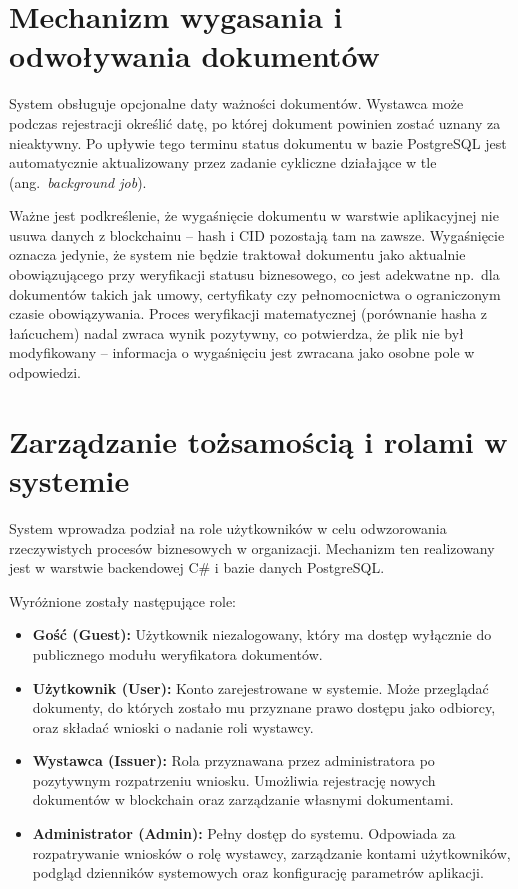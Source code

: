 \documentclass[12pt,a4paper,twoside]{report}
\begin{document}
\section{Mechanizm wygasania i odwoływania dokumentów}

System obsługuje opcjonalne daty ważności dokumentów. Wystawca może podczas rejestracji
określić datę, po której dokument powinien zostać uznany za nieaktywny. Po upływie tego
terminu status dokumentu w bazie PostgreSQL jest automatycznie aktualizowany przez
zadanie cykliczne działające w tle (ang.~\textit{background job}).

Ważne jest podkreślenie, że wygaśnięcie dokumentu w warstwie aplikacyjnej nie usuwa
danych z blockchainu -- hash i CID pozostają tam na zawsze. Wygaśnięcie oznacza jedynie,
że system nie będzie traktował dokumentu jako aktualnie obowiązującego przy weryfikacji
statusu biznesowego, co jest adekwatne np.~dla dokumentów takich jak umowy, certyfikaty
czy pełnomocnictwa o ograniczonym czasie obowiązywania. Proces weryfikacji matematycznej
(porównanie hasha z łańcuchem) nadal zwraca wynik pozytywny, co potwierdza, że plik nie
był modyfikowany -- informacja o wygaśnięciu jest zwracana jako osobne pole w odpowiedzi.

\section{Zarządzanie tożsamością i rolami w systemie}

System wprowadza podział na role użytkowników w celu odwzorowania rzeczywistych procesów
biznesowych w organizacji. Mechanizm ten realizowany jest w warstwie backendowej C\#
i bazie danych PostgreSQL.

Wyróżnione zostały następujące role:
\begin{itemize}
    \item \textbf{Gość (Guest):} Użytkownik niezalogowany, który ma dostęp wyłącznie
          do publicznego modułu weryfikatora dokumentów.
    \item \textbf{Użytkownik (User):} Konto zarejestrowane w systemie. Może przeglądać
          dokumenty, do których zostało mu przyznane prawo dostępu jako odbiorcy,
          oraz składać wnioski o nadanie roli wystawcy.
    \item \textbf{Wystawca (Issuer):} Rola przyznawana przez administratora po pozytywnym
          rozpatrzeniu wniosku. Umożliwia rejestrację nowych dokumentów w blockchain
          oraz zarządzanie własnymi dokumentami.
    \item \textbf{Administrator (Admin):} Pełny dostęp do systemu. Odpowiada za
          rozpatrywanie wniosków o rolę wystawcy, zarządzanie kontami użytkowników,
          podgląd dzienników systemowych oraz konfigurację parametrów aplikacji.
\end{itemize}
\end{document}
